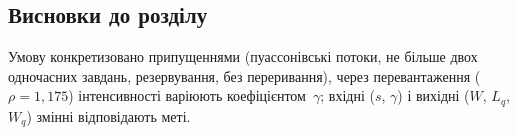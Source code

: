 \subsection{Висновки до розділу}

Умову конкретизовано припущеннями (пуассонівські потоки, не більше двох одночасних завдань,
резервування, без переривання), через перевантаження ($\rho=1{,}175$) інтенсивності варіюють
коефіцієнтом~$\gamma$; вхідні ($s$, $\gamma$) і вихідні ($W$, $L_q$, $W_q$) змінні відповідають меті.
